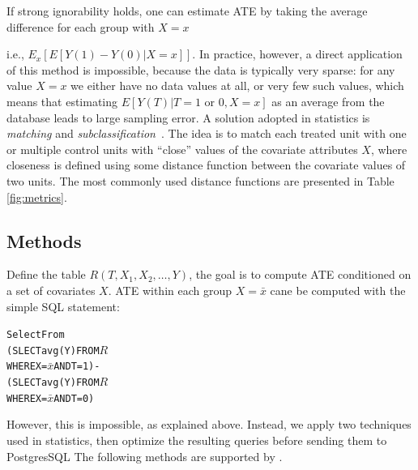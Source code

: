  If strong ignorability holds, one can estimate ATE by
 taking the  average difference for each group with $X=x$  i.e., $E_x[E[Y(1)-Y(0)| X=x]]$.
In practice, however, a direct application of this method is
impossible, because the data is typically very sparse: for any value
$X=x$ we either have no data values at all, or very few such values,
which means that estimating $E[Y(T)|T=1\mbox{ or }0,X=x]$ as an
average from the database leads to large sampling error. A solution adopted in statistics is {\em matching} and {\em  subclassification}~\cite{Rubin1983b}.  The idea is to match each treated unit with one or multiple control
units with ``close'' values of the covariate attributes $X$, where
closeness is defined using some distance function between the covariate values of two units.  The most
commonly used distance functions are presented  in Table \ref{fig:metrics}. 





\vspace{-0.3cm}
\subsection{Methods}
\label{sec:algo}
Define the table $R(T, X_1, X_2, \ldots, Y)$, the goal is to compute
ATE conditioned on a set of covariates $X$. ATE within each group $X = \bar{x}$
cane be computed with the simple SQL statement:
\vspace{-0.2cm}
\begin{alltt} \scriptsize
  Select From
    (SLECT avg(Y) FROM \(R\)
         WHERE X = \(\bar{x}\) AND T=1)-
    (SLECT avg(Y) FROM \(R\)
         WHERE X = \(\bar{x}\) AND T=0)
\end{alltt}

However, this is impossible, as explained above.
Instead, we apply two techniques used in statistics, then optimize
the resulting queries before sending them to PostgresSQL The following methods are supported by \GSQL.

